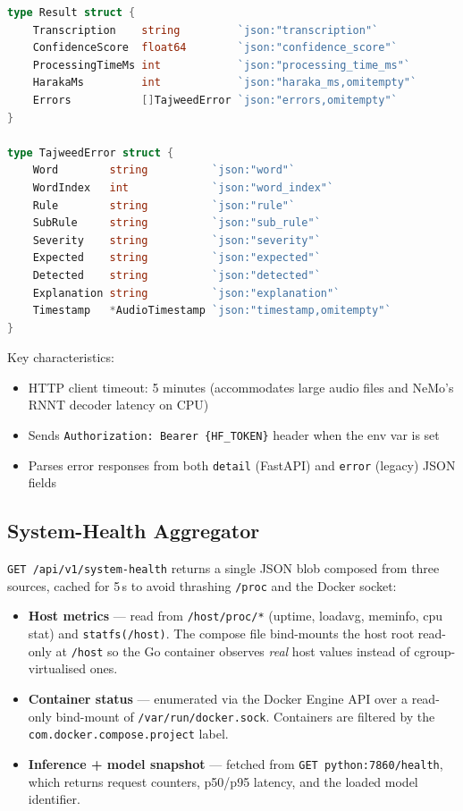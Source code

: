 \begin{lstlisting}[language=Go, caption={Inference result structure}]
type Result struct {
    Transcription    string         `json:"transcription"`
    ConfidenceScore  float64        `json:"confidence_score"`
    ProcessingTimeMs int            `json:"processing_time_ms"`
    HarakaMs         int            `json:"haraka_ms,omitempty"`
    Errors           []TajweedError `json:"errors,omitempty"`
}

type TajweedError struct {
    Word        string          `json:"word"`
    WordIndex   int             `json:"word_index"`
    Rule        string          `json:"rule"`
    SubRule     string          `json:"sub_rule"`
    Severity    string          `json:"severity"`
    Expected    string          `json:"expected"`
    Detected    string          `json:"detected"`
    Explanation string          `json:"explanation"`
    Timestamp   *AudioTimestamp `json:"timestamp,omitempty"`
}
\end{lstlisting}

Key characteristics:
\begin{itemize}
    \item HTTP client timeout: 5 minutes (accommodates large audio files and NeMo's RNNT decoder latency on CPU)
    \item Sends \texttt{Authorization: Bearer \{HF\_TOKEN\}} header when the env var is set
    \item Parses error responses from both \texttt{detail} (FastAPI) and \texttt{error} (legacy) JSON fields
\end{itemize}

\subsection{System-Health Aggregator}
\label{subsec:system_health}

\texttt{GET /api/v1/system-health} returns a single JSON blob composed from three sources, cached for 5\,s to avoid thrashing \texttt{/proc} and the Docker socket:

\begin{itemize}
  \item \textbf{Host metrics} --- read from \texttt{/host/proc/*} (uptime, loadavg, meminfo, cpu stat) and \texttt{statfs(/host)}. The compose file bind-mounts the host root read-only at \texttt{/host} so the Go container observes \emph{real} host values instead of cgroup-virtualised ones.
  \item \textbf{Container status} --- enumerated via the Docker Engine API over a read-only bind-mount of \texttt{/var/run/docker.sock}. Containers are filtered by the \texttt{com.docker.compose.project} label.
  \item \textbf{Inference + model snapshot} --- fetched from \texttt{GET python:7860/health}, which returns request counters, p50/p95 latency, and the loaded model identifier.
\end{itemize}

